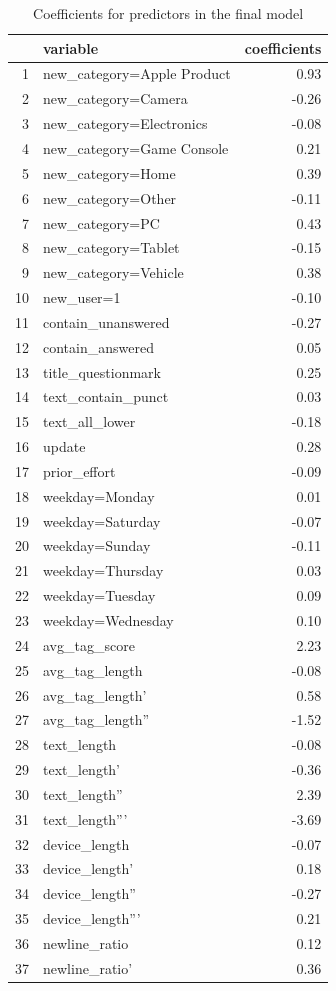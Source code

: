 \documentclass{article}
\begin{document}
\begin{table}[ht]
\centering
\begin{tabular}{rlr}
  \hline
 & variable & coefficients \\ 
  \hline
1 & new\_category=Apple Product & 0.93 \\ 
  2 & new\_category=Camera & -0.26 \\ 
  3 & new\_category=Electronics & -0.08 \\ 
  4 & new\_category=Game Console & 0.21 \\ 
  5 & new\_category=Home & 0.39 \\ 
  6 & new\_category=Other & -0.11 \\ 
  7 & new\_category=PC & 0.43 \\ 
  8 & new\_category=Tablet & -0.15 \\ 
  9 & new\_category=Vehicle & 0.38 \\ 
  10 & new\_user=1 & -0.10 \\ 
  11 & contain\_unanswered & -0.27 \\ 
  12 & contain\_answered & 0.05 \\ 
  13 & title\_questionmark & 0.25 \\ 
  14 & text\_contain\_punct & 0.03 \\ 
  15 & text\_all\_lower & -0.18 \\ 
  16 & update & 0.28 \\ 
  17 & prior\_effort & -0.09 \\ 
  18 & weekday=Monday & 0.01 \\ 
  19 & weekday=Saturday & -0.07 \\ 
  20 & weekday=Sunday & -0.11 \\ 
  21 & weekday=Thursday & 0.03 \\ 
  22 & weekday=Tuesday & 0.09 \\ 
  23 & weekday=Wednesday & 0.10 \\ 
  24 & avg\_tag\_score & 2.23 \\ 
  25 & avg\_tag\_length & -0.08 \\ 
  26 & avg\_tag\_length' & 0.58 \\ 
  27 & avg\_tag\_length'' & -1.52 \\ 
  28 & text\_length & -0.08 \\ 
  29 & text\_length' & -0.36 \\ 
  30 & text\_length'' & 2.39 \\ 
  31 & text\_length''' & -3.69 \\ 
  32 & device\_length & -0.07 \\ 
  33 & device\_length' & 0.18 \\ 
  34 & device\_length'' & -0.27 \\ 
  35 & device\_length''' & 0.21 \\ 
  36 & newline\_ratio & 0.12 \\ 
  37 & newline\_ratio' & 0.36 \\ 
   \hline
\end{tabular}
\caption{Coefficients for predictors in the final model} 
\label{table:coefficients}
\end{table}
\end{document}
